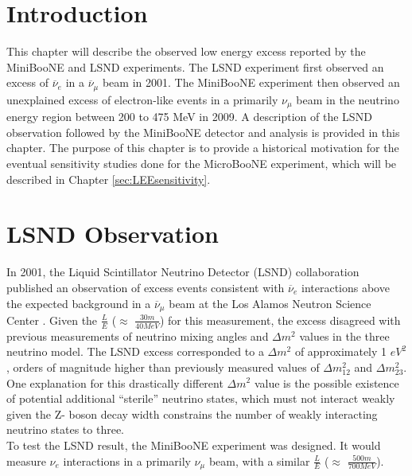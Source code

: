 
\section{Introduction}
This chapter will describe the observed low energy excess reported by the MiniBooNE and LSND experiments. The LSND experiment first observed an excess of $\overline{\nu}_e$ in a $\overline{\nu}_\mu$ beam in 2001. The MiniBooNE experiment then observed an unexplained excess of electron-like events in a primarily $\nu_\mu$ beam in the neutrino energy region between 200 to 475 MeV in 2009. A description of the LSND observation followed by the MiniBooNE detector and analysis is provided in this chapter. The purpose of this chapter is to provide a historical motivation for the eventual sensitivity studies done for the MicroBooNE experiment, which will be described in Chapter \ref{sec:LEEsensitivity}.\\

\section{LSND Observation}

In 2001, the Liquid Scintillator Neutrino Detector (LSND) collaboration published an observation of excess events consistent with $\overline{\nu}_e$ interactions above the expected background in a $\overline{\nu}_\mu$ beam at the Los Alamos Neutron Science Center \cite{LSNDPaper}. Given the $\frac{L}{E}$ ($\approx$ $\frac{30 m}{40 MeV}$) for this measurement, the excess disagreed with previous measurements of neutrino mixing angles and $\Delta m^2$ values in the three neutrino model. The LSND excess corresponded to a $\Delta m^2$ of approximately 1 $eV^2$, orders of magnitude higher than previously measured values of $\Delta m_{12}^2$ and $\Delta m_{23}^2$. One explanation for this drastically different $\Delta m^2$ value is the possible existence of potential additional ``sterile'' neutrino states, which must not interact weakly given the Z- boson decay width constrains the number of weakly interacting neutrino states to three.\\

To test the LSND result, the MiniBooNE experiment was designed. It would measure $\nu_e$ interactions in a primarily $\nu_\mu$ beam, with a similar $\frac{L}{E}$ ($\approx$ $\frac{500m}{700 MeV}$).


